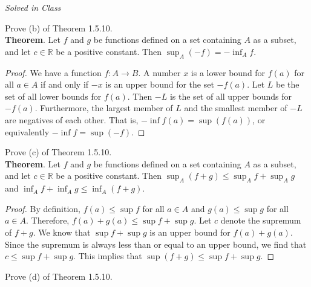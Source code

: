\documentclass[12pt]{book}
\newenvironment{exercise}[2][Exercise]{\begin{trivlist}
\item[\hskip \labelsep {\bfseries #1}\hskip \labelsep {\bfseries #2.}]}{\end{trivlist}}
\begin{document}
\begin{exercise}{1.4.6}
\begin{exercise}{1.5.9}
\emph{Solved in Class}
\end{exercise}

\begin{exercise}{1.5.11}
Prove (b) of Theorem 1.5.10. \\

\textbf{Theorem}. Let $f$ and $g$ be functions defined on a set containing $A$ as a subset, and let $c \in \mathbb{R}$ be a positive constant. Then $\sup_A (-f) = - \inf_A f$.

	\begin{proof}
	We have a function $f: A \to B$. A number $x$ is a lower bound for $f(a)$ for all $a \in A$ if and only if $-x$ is an upper bound for the set $-f(a)$. Let  $L$ be the set of all lower bounds for $f(a)$. Then $-L$ is the set of all upper bounds for $-f(a)$. Furthermore, the largest member of $L$ and the smallest member of $-L$ are negatives of each other. That is, $- \inf f(a) = \sup (f(a))$, or equivalently $- \inf f = \sup (-f)$.  
	\end{proof}
\end{exercise}

\begin{exercise}{1.5.12}
Prove (c) of Theorem 1.5.10.\\

\textbf{Theorem}. Let $f$ and $g$ be functions defined on a set containing $A$ as a subset, and let $c \in \mathbb{R}$ be a positive constant. Then $\sup_A (f+g) \leq \sup_A f + \sup_A g $ and $\inf_A f + \inf_A g \leq \inf_A (f+g)$.

	\begin{proof}
	By definition, $f(a) \leq \sup f$ for all $a \in A$ and $g(a) \leq \sup g$ for all $a \in A$. Therefore, $f(a)+g(a) \leq \sup f + \sup g$. Let $c$ denote the supremum of $f+g$. We know that $\sup f + \sup g$ is an upper bound  for $f(a)+g(a)$. Since the supremum is always less than or equal to an upper bound, we find that $c \leq \sup f + \sup g$. This implies that $\sup (f+g) \leq \sup f + \sup g$.
	\end{proof}
\end{exercise}

\begin{exercise}{1.5.13}
Prove (d) of Theorem 1.5.10. \\


\end{exercise}
\end{exercise}
\end{document}

